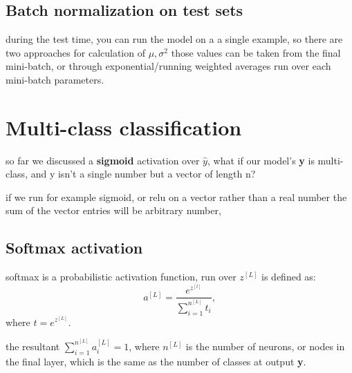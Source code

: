 \documentclass[4apaper,12pt]{book}
\begin{document}
\begin{description}
  \subsection{Batch normalization on test sets}
\item during the test time, you can run the model on a a single example, so there are two approaches for calculation of $\mu, \sigma^2$ those values can be taken from the final mini-batch, or through exponential/running weighted averages run over each mini-batch parameters.
  \end{description}

  \section{Multi-class classification}
  \begin{description}
  \item so far we discussed a \textbf{sigmoid} activation over \textbf{$\hat{y}$}, what if our model's \textbf{y} is multi-class, and y isn't a single number but a vector of length n?
    \item if we run for example sigmoid, or relu on a vector rather than a real number the sum of the vector entries will be arbitrary number,
    \subsection{Softmax activation}
  \item softmax is a probabilistic activation function, run over $z^{[L]}$ is defined as: $$
    a^{[L]}=\frac{e^{z^{[l]}}}{\sum_{i=1}^{n^{[L]}}t_i},$$  where $t=e^{z^{[L]}} $.
    \item the resultant $\sum_{i=1}^{n^{[L]}}{a_i^{[L]}}=1$, where $n^{[L]}$ is the number of neurons, or nodes in the final layer, which is the same as the number of classes at output \textbf{y}.
  \end{description}
\end{document}
